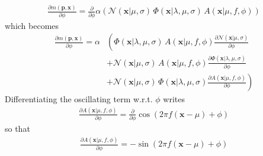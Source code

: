 \documentclass{article}
\begin{document}
\begin{align}
\frac{\partial m\left(\mathbf{p},\mathbf{x}\right)}{\partial \phi} = \frac{\partial}{\partial \phi}\alpha\left(\mathcal{N}(\mathbf{x}|\mu,\sigma) \, \Phi(\mathbf{x}|\lambda,\mu,\sigma)  \, A(\mathbf{x}|\mu,f,\phi)\right)
\end{align}
which becomes
\begin{align}
\frac{\partial m\left(\mathbf{p},\mathbf{x}\right)}{\partial \phi} = \alpha&\left(\Phi(\mathbf{x}|\lambda,\mu,\sigma) \, A(\mathbf{x}|\mu,f,\phi) \frac{\partial \mathcal{N}(\mathbf{x}|\mu,\sigma)}{\partial \phi} \right. \\ 
&+ \mathcal{N}(\mathbf{x}|\mu,\sigma) \, A(\mathbf{x}|\mu,f,\phi) \frac{\partial \Phi(\mathbf{x}|\lambda,\mu,\sigma)}{\partial \phi} \\
&+ \left. \mathcal{N}(\mathbf{x}|\mu,\sigma) \, \Phi(\mathbf{x}|\lambda,\mu,\sigma) \frac{\partial A(\mathbf{x}|\mu,f,\phi)}{\partial \phi} \right)
\end{align}
Differentiating the oscillating term w.r.t. $\phi$ writes
\begin{align}
\frac{\partial A(\mathbf{x}|\mu,f,\phi)}{\partial \phi} = \frac{\partial}{\partial\phi} \cos\left(2 \pi f \left(\mathbf{x} - \mu\right) + \phi\right)
\end{align}
so that
\begin{align}
\frac{\partial A(\mathbf{x}|\mu,f,\phi)}{\partial \phi} = -\sin(2\pi f (\mathbf{x}-\mu)+\phi)
\end{align}
%
\end{document}
